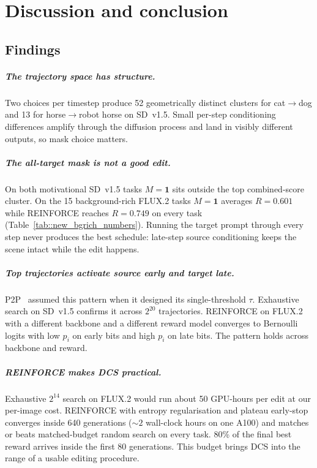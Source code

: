\chapter{Discussion and conclusion}
\label{ch:conclusion}

\section{Findings}

\paragraph{The trajectory space has structure.}
Two choices per timestep produce 52 geometrically distinct clusters for cat$\to$dog and 13 for horse$\to$robot horse on SD~v1.5. Small per-step conditioning differences amplify through the diffusion process and land in visibly different outputs, so mask choice matters.

\paragraph{The all-target mask is not a good edit.}
On both motivational SD~v1.5 tasks $M=\mathbf{1}$ sits outside the top combined-score cluster. On the 15 background-rich FLUX.2 tasks $M=\mathbf{1}$ averages $R=0.601$ while REINFORCE reaches $R=0.749$ on every task (Table~\ref{tab::new_bgrich_numbers}). Running the target prompt through every step never produces the best schedule: late-step source conditioning keeps the scene intact while the edit happens.

\paragraph{Top trajectories activate source early and target late.}
P2P~\cite{hertz2022prompt} assumed this pattern when it designed its single-threshold $\tau$. Exhaustive search on SD~v1.5 confirms it across $2^{20}$ trajectories. REINFORCE on FLUX.2 with a different backbone and a different reward model converges to Bernoulli logits with low $p_i$ on early bits and high $p_i$ on late bits. The pattern holds across backbone and reward.

\paragraph{REINFORCE makes DCS practical.}
Exhaustive $2^{14}$ search on FLUX.2 would run about 50 GPU-hours per edit at our per-image cost. REINFORCE with entropy regularisation and plateau early-stop converges inside 640 generations ($\sim 2$ wall-clock hours on one A100) and matches or beats matched-budget random search on every task. 80\% of the final best reward arrives inside the first 80 generations. This budget brings DCS into the range of a usable editing procedure.

